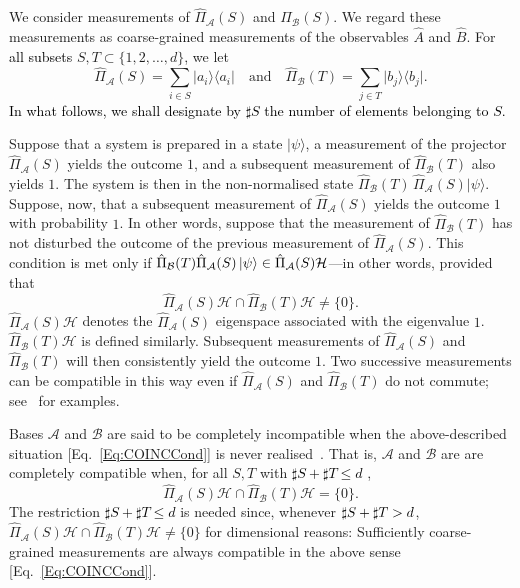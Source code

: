 \documentclass[%
 reprint,
superscriptaddress,
nofootinbib,
bibnotes,
 amsmath,amssymb,
 aps,
]{revtex4-1}
\theoremstyle{plain}
\newcommand*{\ketbra}[2]{\lvert #1 \rangle\!\langle #2 \rvert}
\newcommand{\Dave}[1]{\textcolor{black}{#1} }
\newcommand{\cket}[1]{|#1\rangle}
\newcommand{\Acal}{{\mathcal A}}
\newcommand{\Bcal}{{\mathcal B}}
\newcommand{\Hcal}{{\mathcal H}}
\newcommand{\PiAcal}{{\hat{\Pi}_{\Acal}}}
\newcommand{\PiBcal}{{\hat{\Pi}_{\Bcal}}}
\begin{document}
We consider measurements of $\PiAcal(S)$ and $\PiBcal(S)$. 
We regard these measurements as coarse-grained measurements of the observables $\hat{A}$ and $\hat{B}$. For \Dave{all subsets} $S, T \subset \{1,2,\dots, d\}$, we let 
\begin{equation}
\PiAcal(S)=\sum_{i\in S} \ketbra{a_i}{a_i} \quad \mathrm{and} \quad \PiBcal(T)
=\sum_{j\in T} \ketbra{b_j}{b_j} . 
\end{equation}
\Dave{In what follows, we shall designate by $\sharp S$ the number of elements belonging to $S$.}

Suppose that a system is prepared in a state $\cket{\psi}$, a measurement of the projector $\PiAcal(S)$  yields the outcome $1$, and a subsequent measurement of $\PiBcal(T)$ also yields $1$. The system is then in the non-normalised state $\PiBcal(T) \, \PiAcal(S)\cket{\psi}$. Suppose, now, that a subsequent measurement of $\PiAcal(S)$ yields the outcome $1$ with probability $1$. In other words, suppose that the measurement of $\PiBcal(T)$ has not disturbed the outcome of the previous measurement of $\PiAcal(S)$. This
condition is met only if $\PiBcal(T)\PiAcal(S) \ket{\psi} \in \PiAcal(S)\Hcal$---in other words, provided that
\begin{equation}
\label{Eq:COINCCond}
\PiAcal(S)\Hcal\cap\PiBcal(T)\Hcal\not=\{0\}.
\end{equation}
$\PiAcal(S)\Hcal$ denotes the $\PiAcal(S)$ eigenspace associated with the eigenvalue $1$. $\PiBcal(T)\Hcal$ is defined similarly. Subsequent measurements of $\PiAcal(S)$ and $\PiBcal(T)$ will then consistently yield the outcome $1$. 
Two successive measurements can be compatible in this way
even if $\PiAcal(S)$ and $\PiBcal(T)$ do not commute; see~\cite{debievre2023} for examples.

Bases $\Acal$ and $\Bcal$ are said to be completely incompatible  when the above-described situation [Eq.~\eqref{Eq:COINCCond}] is never realised~\cite{DeBievre2021, debievre2023}. That is, $\Acal$ and $\Bcal$ are are completely compatible when, for all $S,T$ with \Dave{$\sharp S+\sharp T\leq d$}, 
\begin{equation}
    \PiAcal(S)\Hcal\cap\PiBcal(T)\Hcal=\{0\}.
\end{equation}
The restriction \Dave{$\sharp S+\sharp T\leq d$} is needed since, whenever $\Dave{\sharp S+\sharp T}> d$, $\PiAcal(S)\Hcal\cap\PiBcal(T)\Hcal\not=\{0\}$ for dimensional reasons: Sufficiently coarse-grained measurements  are always  compatible in the above sense [Eq.~\eqref{Eq:COINCCond}]. 
\end{document}
